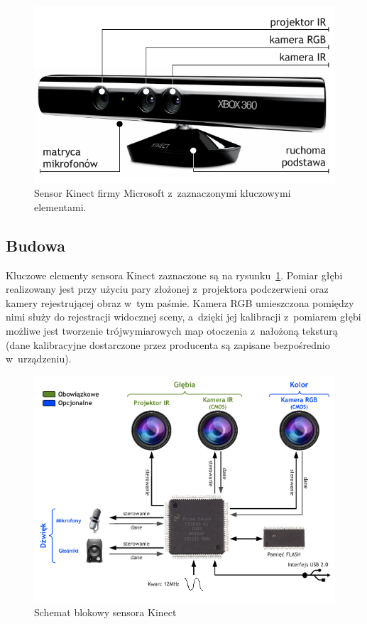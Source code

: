 \begin{figure}[h!]
\centering
\includegraphics{../img/kinect_hardware}
\caption[Sensor Kinect firmy Microsoft]{Sensor Kinect firmy Microsoft z~zaznaczonymi
kluczowymi elementami.}
\label{fig:kinect_hardware}
\end{figure}

\subsection{Budowa}

Kluczowe elementy sensora Kinect zaznaczone są na rysunku~\ref{fig:kinect_hardware}.
Pomiar głębi realizowany jest przy użyciu pary złożonej z~projektora podczerwieni
oraz kamery rejestrującej obraz w~tym paśmie. Kamera RGB umieszczona pomiędzy nimi
służy do rejestracji widocznej sceny, a~dzięki jej kalibracji z~pomiarem głębi
możliwe jest tworzenie trójwymiarowych map otoczenia z~nałożoną teksturą (dane
kalibracyjne dostarczone przez producenta są zapisane bezpośrednio w~urządzeniu).

\begin{figure}[h!]
\centering
\includegraphics{../../Common/img/primesense}
\caption{Schemat blokowy sensora Kinect}
\label{fig:kinect_block}
\end{figure}

